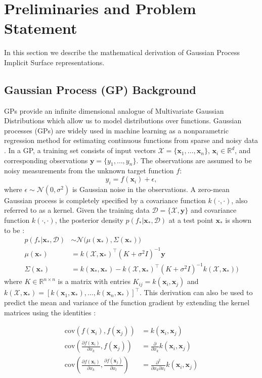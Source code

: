 \documentclass[letterpaper, 10 pt, conference]{ieeeconf}  %
\newcommand{\by}{\mathbf{y}}
\newcommand{\bx}{\mathbf{x}}
\newcommand{\mX}{\mathcal{X}}
\newcommand{\mD}{\mathcal{D}}
\newcommand{\mN}{\mathcal{N}}
\begin{document}
\section{Preliminaries and Problem Statement}

In this section we describe the mathematical derivation of Gaussian Process Implicit Surface representations.

\subsection{Gaussian Process (GP) Background}
GPs provide an infinite dimensional analogue of Multivariate
Gaussian Distributions which allow us to model distributions over
functions. Gaussian processes (GPs) are widely used in machine learning as a nonparametric regression method for estimating continuous functions from sparse and noisy data \cite{rasmussen2010gaussian}.
In a GP, a training set consists of input vectors $\mX = \{\bx_1, \ldots, \bx_n\}$, $\bx_i \in \mathbb{R}^d$, and corresponding observations $\by = \{y_1, \ldots, y_n\}$. The observations are assumed to be noisy measurements from the unknown target function $f$:
\begin{equation}
y_i = f(\bx_i) + \epsilon,
\end{equation}
where $\epsilon \sim \mN(0,\sigma^2)$ is Gaussian noise in the observations.
A zero-mean Gaussian process is completely specified by a covariance function $k(\cdot,\cdot)$, also referred to as a kernel.
Given the training data $\mD = \{\mX, \by\}$ and covariance function $k(\cdot,\cdot)$, the posterior density $p(f_*|\bx_*,\mD)$ at a test point $\bx_{*}$ is shown to be \cite{rasmussen2010gaussian}:
\begin{align*}
	p(f_*|\bx_*,\mD) &\sim \mN\big(\mu(\bx_*), \Sigma(\bx_*)\big) \\
	\mu(\bx_*) &= k(\mX,\bx_*)^{\intercal}(K + \sigma^2I)^{-1}\by \\
	\Sigma(\bx_*) &= k(\bx_*,\bx_*)-k(\mX,\bx_*)^{\intercal}(K+\sigma^2I)^{-1}k(\mX,\bx_*)\big) 
\end{align*}
where $K \in \mathbb{R}^{n \times n}$ is a matrix with entries $K_{ij} = k(\bx_i,\bx_j)$ and $k(\mX,\bx_*) = [k(\bx_1,\bx_*),\ldots,k(\bx_n,\bx_*)]^{\intercal}$. 
This derivation can also be used to predict the mean and variance of the function gradient by extending the kernel matrices using the identities \cite{solak2003derivative}:

\vspace{-2ex}
\begin{align}
	\text{cov}\left(f(\bx_i), f(\bx_j) \right) &=  k(\bx_i, \bx_j) \\
	\text{cov}\left(\frac{\partial f (\bx_i)}{\partial x_k}, f(\bx_j) \right) &= \frac{\partial}{\partial x_k} k(\bx_i, \bx_j) \label{eq:mean_gradient}\\
	\text{cov}\left(\frac{\partial f (\bx_i)}{\partial x_k}, \frac{\partial f (\bx_j)}{\partial x_l} \right) &= \frac{\partial^2}{\partial x_k \partial x_l} k(\bx_i, \bx_j)\label{eq:cov_gradient}
\end{align}
\end{document}
